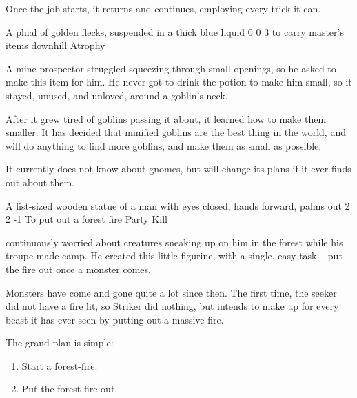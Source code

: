 \begin{multicols}{2}
Once the job starts, it returns and continues, employing every trick it can.

\showStdSpells

  {A phial of golden flecks, suspended in a thick blue liquid}%
  {0}%
  {0}%
  {3}%
  {to carry master's items downhill}%
  {Atrophy}%
  {
    \setcounter{Earth}{2}
    \setcounter{Water}{2}
    \setcounter{Caving}{3}
  }%

A mine prospector struggled squeezing through small openings, so he asked  to make this item for him.
He never got to drink the potion to make him small, so it stayed, unused, and unloved, around a goblin's neck.

After it grew tired of goblins passing it about, it learned how to make them smaller.
It has decided that minified goblins are the best thing in the world, and will do anything to find more goblins, and make them as small as possible.

It currently does not know about gnomes, but will change its plans if it ever finds out about them.

\showStdSpells

  {A fist-sized wooden statue of a man with eyes closed, hands forward, palms out}%
  {2}%
  {2}%
  {-1}%
  {To put out a forest fire}%
  {Party Kill}%
  {
    \setcounter{Fire}{3}
    \setcounter{Wyldcrafting}{1}
  }%

 continuously worried about creatures sneaking up on him in the forest while his troupe made camp.
He created this little figurine, with a single, easy task -- put the fire out once a monster comes.

Monsters have come and gone quite a lot since then.
The first time, the \gls{seeker} did not have a fire lit, so Striker did nothing, but intends to make up for every beast it has ever seen by putting out a massive fire.

The grand plan is simple:

\begin{enumerate}
  \item
  Start a forest-fire.
  \item
  Put the forest-fire out.
\end{enumerate}

\end{multicols}
